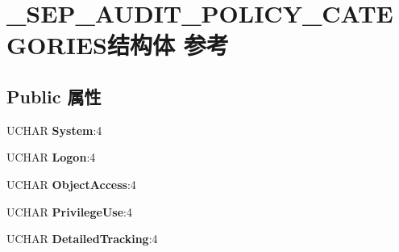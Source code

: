\hypertarget{struct___s_e_p___a_u_d_i_t___p_o_l_i_c_y___c_a_t_e_g_o_r_i_e_s}{}\section{\+\_\+\+S\+E\+P\+\_\+\+A\+U\+D\+I\+T\+\_\+\+P\+O\+L\+I\+C\+Y\+\_\+\+C\+A\+T\+E\+G\+O\+R\+I\+E\+S结构体 参考}
\label{struct___s_e_p___a_u_d_i_t___p_o_l_i_c_y___c_a_t_e_g_o_r_i_e_s}
\subsection*{Public 属性}
\begin{DoxyCompactItemize}
\item 
\mbox{\label{struct___s_e_p___a_u_d_i_t___p_o_l_i_c_y___c_a_t_e_g_o_r_i_e_s_a511a390ecff887ea5660a50ba56ad239}} 
U\+C\+H\+AR {\bfseries System}\+:4
\item 
\mbox{\label{struct___s_e_p___a_u_d_i_t___p_o_l_i_c_y___c_a_t_e_g_o_r_i_e_s_aaf83d866f3a0490ae318615b59e0fa44}} 
U\+C\+H\+AR {\bfseries Logon}\+:4
\item 
\mbox{\label{struct___s_e_p___a_u_d_i_t___p_o_l_i_c_y___c_a_t_e_g_o_r_i_e_s_a0dc7f34e3fa2354351c10077c0d97f31}} 
U\+C\+H\+AR {\bfseries Object\+Access}\+:4
\item 
\mbox{\label{struct___s_e_p___a_u_d_i_t___p_o_l_i_c_y___c_a_t_e_g_o_r_i_e_s_aa9ccf5e2ad765fa2a47b155dc5efd1ac}} 
U\+C\+H\+AR {\bfseries Privilege\+Use}\+:4
\item 
\mbox{\label{struct___s_e_p___a_u_d_i_t___p_o_l_i_c_y___c_a_t_e_g_o_r_i_e_s_aa5087dddb3519c6ae0b6b6044abc79df}} 
U\+C\+H\+AR {\bfseries Detailed\+Tracking}\+:4
\item 
\mbox{\label{struct___s_e_p___a_u_d_i_t___p_o_l_i_c_y___c_a_t_e_g_o_r_i_e_s_a6144ca7d6b4ee4bb57d0b1f59c837a43}} 

\end{DoxyCompactItemize}
